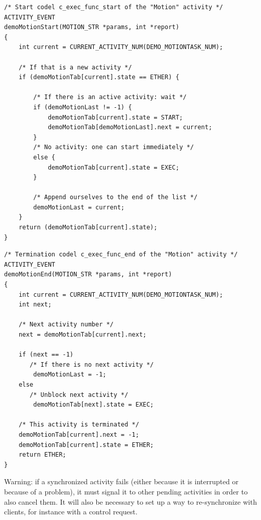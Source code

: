 \begin{center}\begin{cartouche}\small\begin{verbatim}
/* Start codel c_exec_func_start of the "Motion" activity */
ACTIVITY_EVENT
demoMotionStart(MOTION_STR *params, int *report)
{
    int current = CURRENT_ACTIVITY_NUM(DEMO_MOTIONTASK_NUM);

    /* If that is a new activity */
    if (demoMotionTab[current].state == ETHER) {

        /* If there is an active activity: wait */
        if (demoMotionLast != -1) {
            demoMotionTab[current].state = START;
            demoMotionTab[demoMotionLast].next = current;
        }
        /* No activity: one can start immediately */
        else {
            demoMotionTab[current].state = EXEC;
        }

        /* Append ourselves to the end of the list */
        demoMotionLast = current;
    }
    return (demoMotionTab[current].state);
}
\end{verbatim}\end{cartouche}\end{center}

\begin{center}\begin{cartouche}\small\begin{verbatim}
/* Termination codel c_exec_func_end of the "Motion" activity */
ACTIVITY_EVENT
demoMotionEnd(MOTION_STR *params, int *report)
{
    int current = CURRENT_ACTIVITY_NUM(DEMO_MOTIONTASK_NUM);
    int next;

    /* Next activity number */
    next = demoMotionTab[current].next;

    if (next == -1) 
       /* If there is no next activity */
        demoMotionLast = -1;
    else
       /* Unblock next activity */
        demoMotionTab[next].state = EXEC;

    /* This activity is terminated */
    demoMotionTab[current].next = -1;
    demoMotionTab[current].state = ETHER;
    return ETHER;
}
\end{verbatim}\end{cartouche}\end{center}

Warning: if   a   synchronized activity   fails (either  because   it  is
interrupted or because of a problem), it must signal  it to other pending
activities in order to also cancel them. It will also be necessary to set
up  a way to  re-synchronize  with clients,  for  instance with a control
request.


